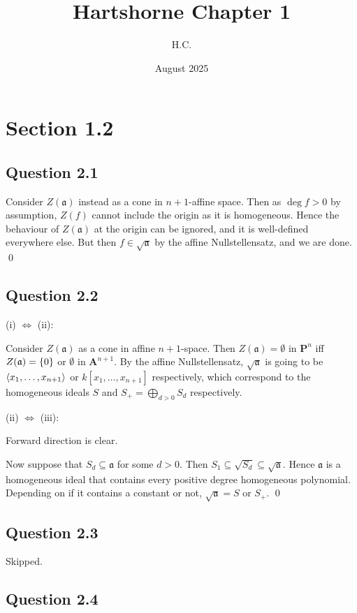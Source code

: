 \documentclass{article}
\title{Hartshorne Chapter 1}
\author{H.C.}
\date{August 2025}
\begin{document}
\maketitle

\section*{Section 1.2}
\subsection*{Question 2.1}

Consider $Z(\mathfrak a)$ instead as a cone in $n+1$-affine space. Then as $\deg f > 0$ by assumption, $Z(f)$ cannot include the origin as it is homogeneous. Hence the behaviour of $Z(\mathfrak a)$ at the origin can be ignored, and it is well-defined everywhere else. But then $f \in \sqrt{\mathfrak a}$ by the affine Nullstellensatz, and we are done. \qed
\lspace

\subsection*{Question 2.2}

(i) $\Leftrightarrow$ (ii):

Consider $Z(\mathfrak a)$ as a cone in affine $n+1$-space. Then $Z(\mathfrak a) = \emptyset$ in $\mathbf{P}^n$ iff $Z(\mathfrak a) = \{0\}$ or $\emptyset$ in $\mathbf{A}^{n+1}$. By the affine Nullstellensatz, $\sqrt{\mathfrak a}$ is going to be $\langle x_1, \dots, x_{n+1}\rangle$ or $k[x_1,\dots, x_{n+1}]$ respectively, which correspond to the homogeneous ideals $S$ and $S_+ = \bigoplus_{d > 0} S_d$ respectively.

\noindent (ii) $\Leftrightarrow$ (iii):

Forward direction is clear.

Now suppose that $S_d \subseteq \mathfrak a$ for some $d>0$. Then $S_1 \subseteq \sqrt{S_d} \subseteq \sqrt{\mathfrak a}$. Hence $\mathfrak a$ is a homogeneous ideal that contains every positive degree homogeneous polynomial. Depending on if it contains a constant or not, $\sqrt{\mathfrak a} = S$ or $S_+$. \qed
\lspace

\subsection*{Question 2.3}

Skipped.

\subsection*{Question 2.4}
\end{document}
